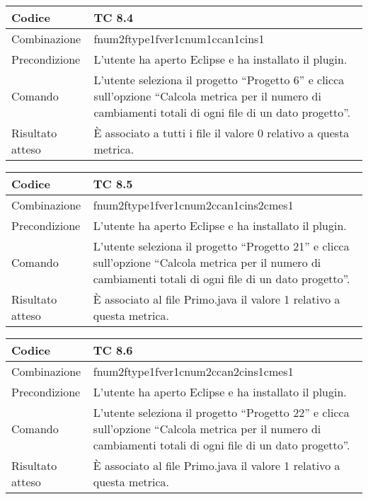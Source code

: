\begin{table}[ht]
\begin{tabular}{|p{3cm}|p{9cm}|}
\hline
\cellcolor{lightgray}Codice				& TC 8.4								\\
\hline
\cellcolor{lightgray}Combinazione		& fnum2ftype1fver1cnum1ccan1cins1									\\
\hline
\cellcolor{lightgray}Precondizione		& L'utente ha aperto Eclipse e ha installato il plugin.		\\
\hline
\cellcolor{lightgray}Comando			& L'utente seleziona il progetto ``Progetto 6''  e clicca sull'opzione ``Calcola metrica per il numero di cambiamenti totali di ogni file di un dato progetto''.	\\
\hline
\cellcolor{lightgray}Risultato atteso	& È associato a tutti i file il valore 0 relativo a questa metrica.\\
\hline
\end{tabular}
\end{table}

\begin{table}[ht]
\begin{tabular}{|p{3cm}|p{9cm}|}
\hline
\cellcolor{lightgray}Codice				& TC 8.5								\\
\hline
\cellcolor{lightgray}Combinazione		& fnum2ftype1fver1cnum2ccan1cins2cmes1									\\
\hline
\cellcolor{lightgray}Precondizione		& L'utente ha aperto Eclipse e ha installato il plugin.		\\
\hline
\cellcolor{lightgray}Comando			& L'utente seleziona il progetto ``Progetto 21''  e clicca sull'opzione ``Calcola metrica per il numero di cambiamenti totali di ogni file di un dato progetto''.	\\
\hline
\cellcolor{lightgray}Risultato atteso	& È associato al file Primo.java il valore 1 relativo a questa metrica.\\
\hline
\end{tabular}
\end{table}

\begin{table}[ht]
\begin{tabular}{|p{3cm}|p{9cm}|}
\hline
\cellcolor{lightgray}Codice				& TC 8.6								\\
\hline
\cellcolor{lightgray}Combinazione		& fnum2ftype1fver1cnum2ccan2cins1cmes1									\\
\hline
\cellcolor{lightgray}Precondizione		& L'utente ha aperto Eclipse e ha installato il plugin.		\\
\hline
\cellcolor{lightgray}Comando			& L'utente seleziona il progetto ``Progetto 22''  e clicca sull'opzione ``Calcola metrica per il numero di cambiamenti totali di ogni file di un dato progetto''.	\\
\hline
\cellcolor{lightgray}Risultato atteso	& È associato al file Primo.java il valore 1 relativo a questa metrica.\\
\hline
\end{tabular}
\end{table}

